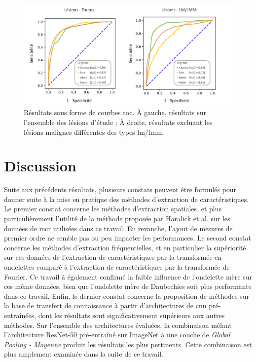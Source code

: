 \begin{figure}[H]
    \centering
    \includegraphics[width=\textwidth]{contents/chapter_5/resources/results_image_classification_roc.pdf}
    \caption{Résultats sous forme de courbes \gls{roc}. À gauche, résultats sur l'ensemble des lésions d'étude ; À droite, résultats excluant les lésions malignes différentes des types \gls{lm}/\gls{lmm}.}
    \label{fig:results_image_classification_roc}
\end{figure}\par

\section{Discussion}
Suite aux précédents résultats, plusieurs constats peuvent être formulés pour donner suite à la mise en pratique des méthodes d'extraction de caractéristiques. Le premier constat concerne les méthodes d'extraction spatiales, et plus particulièrement l'utilité de la méthode proposée par Haralick et al. sur les données de \gls{mcr} utilisées dans ce travail. En revanche, l'ajout de mesures de premier ordre ne semble pas ou peu impacter les performances. Le second constat concerne les méthodes d'extraction fréquentielles, et en particulier la supériorité sur ces données de l'extraction de caractéristiques par la transformée en ondelettes comparé à l'extraction de caractéristiques par la transformée de Fourier. Ce travail à également confirmé la faible influence de l'ondelette mère sur ces même données, bien que l'ondelette mère de Daubechies soit plus performante dans ce travail. Enfin, le dernier constat concerne la proposition de méthodes sur la base de transfert de connaissance à partir d'architectures de \gls{cnn} pré-entraînées, dont les résultats sont significativement supérieurs aux autres méthodes. Sur l'ensemble des architectures évaluées, la combinaison mêlant l'architecture ResNet-50 pré-entraîné sur ImageNet à une couche de \textit{Global Pooling - Moyenne} produit les résultats les plus pertinents. Cette combinaison est plus amplement examinée dans la suite de ce travail.\par

